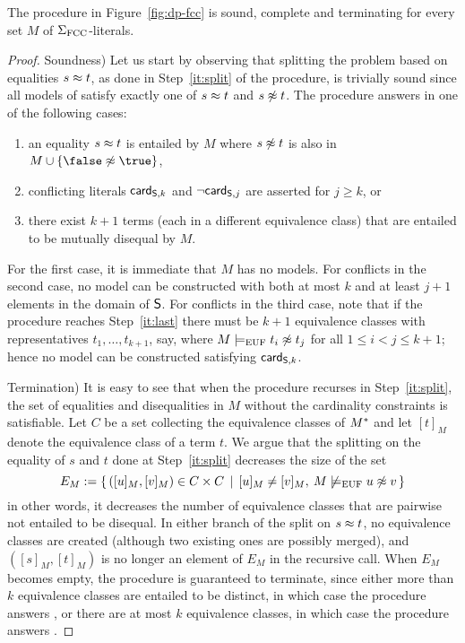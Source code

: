 \documentclass{svjour3}                     %
\begin{document}
\begin{lem}
\label{lem:fcc-correct}
The procedure in Figure~\ref{fig:dp-fcc} is sound, complete and terminating 
for every set $M$ of $\Sigma_\fcc$-literals.
\end{lem}
\begin{proof}
Soundness)
Let us start by observing that splitting the problem based on equalities $s \teq t$, 
as done in Step~\ref{it:split} of the procedure,
is trivially sound since all models of \fcc satisfy exactly one 
of $s \teq t$ and $s \tneq t$.
The procedure answers \unsat in one of the following cases:
\begin{enumerate}
\item
an equality $s \teq t$ is entailed by $M$ where $s \tneq t$ is also in 
$M \cup \{\false \tneq \true\}$,
\item
conflicting literals $\card[\So,k]$ and $\neg \card[\So,j]$ are asserted for $j \geq k$, 
or 
\item
there exist $k+1$ terms (each in a different equivalence class) 
that are entailed to be mutually disequal by $M$.
\end{enumerate}

\noindent
For the first case, it is immediate that $M$ has no models.
For conflicts in the second case, no model can be constructed with 
both at most $k$ and at least $j+1$ elements in the domain of $\So$.
For conflicts in the third case, note that if the procedure reaches Step~\ref{it:last}
there must be $k+1$ equivalence classes with representatives $t_1, \ldots, t_{k+1}$, say,
where $M \ent[\euf] t_i \tneq t_j$ for all $1 \leq i < j \leq k+1$;
hence no model can be constructed satisfying $\card[\So,k]$.
\smallskip

Termination)
It is easy to see that when the procedure recurses in Step~\ref{it:split},
the set of equalities and disequalities in $M$ without the cardinality constraints
is satisfiable.
Let $C$ be a set collecting the equivalence classes of $\cc M$
and let $[t]_M$ denote the equivalence class of a term $t$.
We argue that the splitting on the equality of $s$ and $t$ done at Step~\ref{it:split}
decreases the size of the set
\begin{equation}
 E_M := \{\, ([u]_M,[v]_M) \in C \times C \,\mid\, 
             [u]_M \neq [v]_M,\: M \not\ent[\euf] u \tneq v\, \}
\end{equation}
%
in other words, it decreases
the number of equivalence classes that are pairwise not entailed to be disequal.
In either branch of the split on $s \teq t$,
no equivalence classes are created (although two existing ones are possibly merged), 
and $([s]_M,[t]_M)$ is no longer an element of $E_M$ in the recursive call.
When $E_M$ becomes empty, the procedure is guaranteed to terminate,
since either more than $k$ equivalence classes are entailed to be distinct, 
in which case the procedure answers \unsat, 
or there are at most $k$ equivalence classes,
in which case the procedure answers \sat. 
\smallskip


\end{proof}
\end{document}
